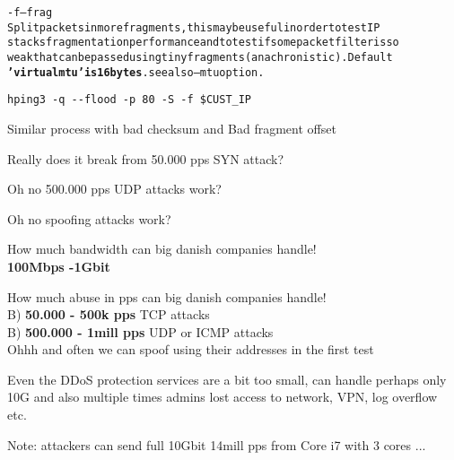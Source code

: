 \documentclass[Screen16to9,17pt]{foils}
\begin{document}
\begin{alltt}\small
-f --frag
    Split  packets  in more fragments, this may be useful in order to test IP
    stacks fragmentation performance and to test if some packet filter is  so
    weak  that  can  be  passed using tiny fragments (anachronistic). Default
    {\bf 'virtual mtu' is 16 bytes}. see also --mtu option.
\end{alltt}

\begin{list1}
\item \verb+hping3 -q --flood -p 80 -S -f $CUST_IP+
\item Similar process with bad checksum and Bad fragment offset
\end{list1}



\centerline{Really does it break from 50.000 pps SYN attack?}



\centerline{Oh no 500.000 pps UDP attacks work?}


\centerline{Oh no spoofing attacks work?}





How much bandwidth can big danish companies handle!\\
{\bf 100Mbps -1Gbit}

How much abuse in pps can big danish companies handle!\\
B) {\bf 50.000 - 500k pps} TCP attacks\\
B) {\bf 500.000 - 1mill pps} UDP or ICMP attacks\\
Ohhh and often we can spoof using their addresses in the first test

Even the DDoS protection services are a bit too small, can handle perhaps only 10G and also multiple times admins lost access to network, VPN, log overflow etc.

\vskip 1cm
Note: attackers can send full 10Gbit 14mill pps from Core i7 with 3 cores ...


\end{document}
